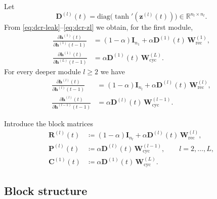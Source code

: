 Let
\[
\mathbf{D}^{(l)}(t) = \mathrm{diag}\!\big(\tanh'(\mathbf{z}^{(l)}(t))\big) \in \mathbb{R}^{n_l\times n_l}.
\]
From \eqref{eq:dcr-leak}--\eqref{eq:dcr-zl} we obtain, for the first module,
\begin{align}
\frac{\partial \mathbf{h}^{(1)}(t)}{\partial \mathbf{h}^{(1)}(t-1)}
&= (1-\alpha) \mathbf{I}_{n_1} + \alpha \mathbf{D}^{(1)}(t)\, \mathbf{W}_{\text{rec}}^{(1)}, \label{eq:dcr-j11}\\
\frac{\partial \mathbf{h}^{(1)}(t)}{\partial \mathbf{h}^{(L)}(t-1)}
&= \alpha \mathbf{D}^{(1)}(t)\, \mathbf{W}_{\text{cyc}}^{(L)}. \label{eq:dcr-j1L}
\end{align}
For every deeper module $l\ge 2$ we have
\begin{align}
\frac{\partial \mathbf{h}^{(l)}(t)}{\partial \mathbf{h}^{(l)}(t-1)}
&= (1-\alpha) \mathbf{I}_{n_l} + \alpha \mathbf{D}^{(l)}(t)\, \mathbf{W}_{\text{rec}}^{(l)}, \label{eq:dcr-jll}\\
\frac{\partial \mathbf{h}^{(l)}(t)}{\partial \mathbf{h}^{(l-1)}(t-1)}
&= \alpha \mathbf{D}^{(l)}(t)\, \mathbf{W}_{\text{cyc}}^{(l-1)}. \label{eq:dcr-jl-lminus1}
\end{align}

Introduce the block matrices
\begin{align}
\mathbf{R}^{(l)}(t) &\coloneqq (1-\alpha) \mathbf{I}_{n_l} + \alpha \mathbf{D}^{(l)}(t)\, \mathbf{W}_{\text{rec}}^{(l)}, \label{eq:dcr-R}\\
\mathbf{P}^{(l)}(t) &\coloneqq \alpha \mathbf{D}^{(l)}(t)\, \mathbf{W}_{\text{cyc}}^{(l-1)},\qquad l=2,\dots,L, \label{eq:dcr-P}\\
\mathbf{C}^{(1)}(t) &\coloneqq \alpha \mathbf{D}^{(1)}(t)\, \mathbf{W}_{\text{cyc}}^{(L)}. \label{eq:dcr-C}
\end{align}

\subsection{Block structure}

